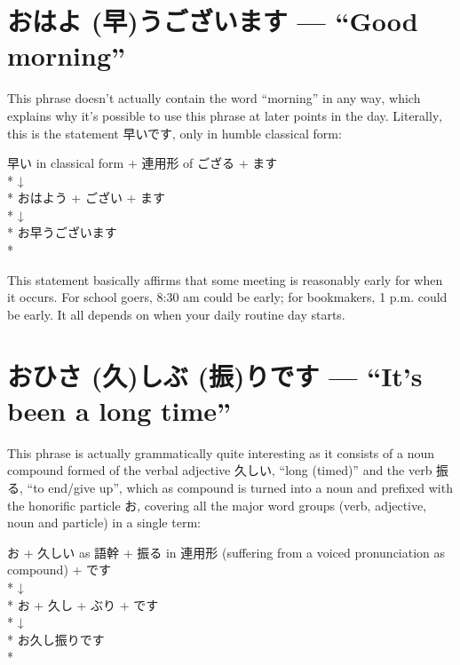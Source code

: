 \documentclass[11pt, b5paper, twoside, openright, onecolumn]{book}
\makeatletter
\newcommand*{\rubystack}[2]{{\relscale{0.5}%
  \begin{tabular}[b]{@{}c@{}}%
    {#1}\\%
   {\textscale{2}{#2}}%
  \end{tabular}}%
}
\DeclareRobustCommand*{\ruby}[2]{%
  \mbox{%
    \setlength{\parskip}{0ex}%
    \BeginAccSupp{method=pdfstringdef,ActualText={#1}}%
      \rubystack{\phantom{#2}}{#1}%
      \llap{%
        \rubystack{#2}{\phantom{#1}}%
      }%
    \EndAccSupp{}%
  }%
}
\renewcommand*{\ruby}[2]{#2 (#1)}%
\newenvironment{exampleblock}{
\setlength{\parindent}{0.6in}
\begin{minipage}[t]{\dimexpr\textwidth-\parindent}}
{\end{minipage}}
\makeatother
\begin{document}
\section*{お\ruby{早}{はよ}うございます — “Good morning”}


This phrase doesn’t actually contain the word “morning” in any way‚ which explains why it’s possible to use this phrase at later points in the day. Literally‚ this is the statement 早いです‚ only in humble classical form:

\vspace{0.4cm}
\begin{exampleblock}
早い in classical form + 連用形 of ござる + ます \\* 
↓ \\* 
おはよう + ござい + ます \\* 
↓ \\* 
お早うございます \\* 
\end{exampleblock}
\vspace{0.2cm}

This statement basically affirms that some meeting is reasonably early for when it occurs. For school goers‚ 8:30 am could be early; for bookmakers‚ 1 p.m. could be early. It all depends on when your daily routine day starts.

\section*{お\ruby{久}{ひさ}し\ruby{振}{ぶ}りです — “It’s been a long time”}

This phrase is actually grammatically quite interesting as it consists of a noun compound formed of the verbal adjective 久しい‚ “long (timed)” and the verb 振る‚ “to end/give up”‚ which as compound is turned into a noun and prefixed with the honorific particle お‚ covering all the major word groups (verb‚ adjective‚ noun and particle) in a single term:

\vspace{0.4cm}
\begin{exampleblock}
お + 久しい as 語幹 + 振る in 連用形 (suffering from a voiced pronunciation as compound) + です \\* 
↓ \\* 
お + 久し + ぶり + です \\* 
↓ \\* 
お久し振りです \\* 
\end{exampleblock}
\vspace{0.2cm}
\end{document}
